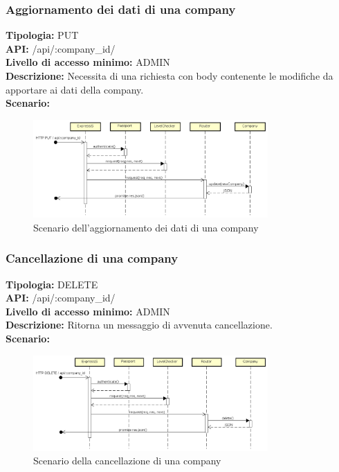 \newpage
\subsubsection{Aggiornamento dei dati di una company}
\textbf{Tipologia:} PUT \\
\textbf{API:} /api/:company\_id/ \\
\textbf{Livello di accesso minimo:} ADMIN \\
\textbf{Descrizione:} Necessita di una richiesta con body contenente le modifiche da apportare ai dati della company. \\
\textbf{Scenario:} 
\begin{figure}[h]
\centering
\includegraphics[width=0.8\textwidth]{res/sections/backend/(PUT)company.png}
\caption{Scenario dell'aggiornamento dei dati di una company}
\end{figure}

\newpage
\subsubsection{Cancellazione di una company}
\textbf{Tipologia:} DELETE \\
\textbf{API:} /api/:company\_id/ \\
\textbf{Livello di accesso minimo:} ADMIN \\
\textbf{Descrizione:} Ritorna un messaggio di avvenuta cancellazione. \\
\textbf{Scenario:} 
\begin{figure}[h]
\centering
\includegraphics[width=0.8\textwidth]{res/sections/backend/(DELETE)company.png}
\caption{Scenario della cancellazione di una company}
\end{figure}

